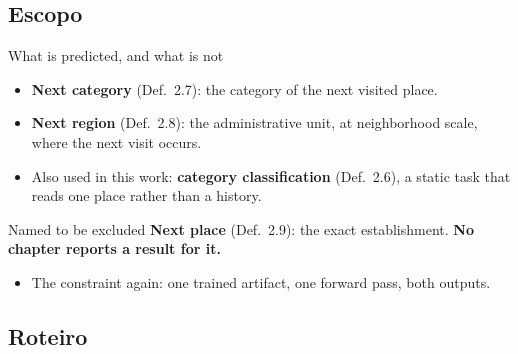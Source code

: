 \documentclass{beamer}
\begin{document}
\subsection{Escopo}

\begin{frame}{What is predicted, and what is not}
    \begin{itemize}
        \item \textbf{Next category} (Def.~2.7): the category of the next visited place.
        \item \textbf{Next region} (Def.~2.8): the administrative unit, at neighborhood scale,
              where the next visit occurs.
        \item Also used in this work: \textbf{category classification} (Def.~2.6), a static task
              that reads one place rather than a history.
    \end{itemize}

    \begin{alertblock}{Named to be excluded}
        \textbf{Next place} (Def.~2.9): the exact establishment.
        \textbf{No chapter reports a result for it.}
    \end{alertblock}

    \begin{itemize}
        \item The constraint again: one trained artifact, one forward pass, both outputs.
    \end{itemize}
\end{frame}

\subsection{Roteiro}
\end{document}

